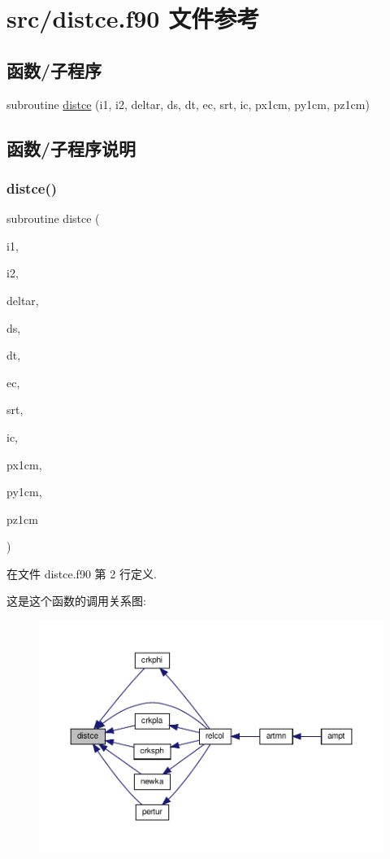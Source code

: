 \hypertarget{distce_8f90}{}\section{src/distce.f90 文件参考}
\label{distce_8f90}
\subsection*{函数/子程序}
\begin{DoxyCompactItemize}
\item 
subroutine \mbox{\hyperlink{distce_8f90_aae347414d1bc458cf6600b176cfdc7ad}{distce}} (i1, i2, deltar, ds, dt, ec, srt, ic, px1cm, py1cm, pz1cm)
\end{DoxyCompactItemize}


\subsection{函数/子程序说明}
\mbox{\label{distce_8f90_aae347414d1bc458cf6600b176cfdc7ad}} 
\subsubsection{\texorpdfstring{distce()}{distce()}}
{\footnotesize\ttfamily subroutine distce (\begin{DoxyParamCaption}\item[{}]{i1,  }\item[{}]{i2,  }\item[{}]{deltar,  }\item[{}]{ds,  }\item[{}]{dt,  }\item[{}]{ec,  }\item[{}]{srt,  }\item[{}]{ic,  }\item[{}]{px1cm,  }\item[{}]{py1cm,  }\item[{}]{pz1cm }\end{DoxyParamCaption})}



在文件 distce.\+f90 第 2 行定义.

这是这个函数的调用关系图\+:
\nopagebreak
\begin{figure}[H]
\begin{center}
\leavevmode
\includegraphics[width=350pt]{distce_8f90_aae347414d1bc458cf6600b176cfdc7ad_icgraph}
\end{center}
\end{figure}
